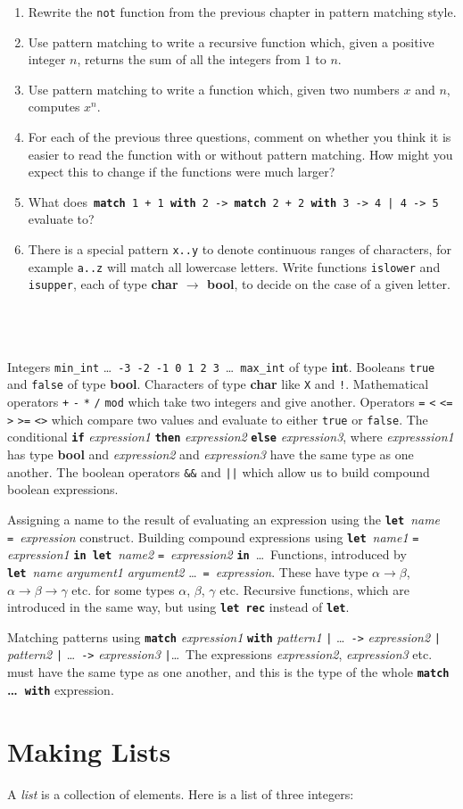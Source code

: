 \documentclass[]{book}
\newcommand\upquote[1]{\textquotesingle#1\textquotesingle}
\newcommand{\sofarstartingoff}{

\noindent 1

\noindent Integers \texttt{min\_int} \ldots\ \texttt{-3}\ \texttt{-2}\ \texttt{-1}\ \texttt{0}\ \texttt{1}\ \texttt{2}\ \texttt{3}\ \ldots\ \texttt{max\_int} of type \textbf{\textrm{int}}. Booleans \texttt{true} and \texttt{false} of type \textbf{\textrm{bool}}. \noindent Characters of type \textrm{\textbf{char}} like \texttt{\upquote{X}} and \texttt{\upquote{!}}. Mathematical operators \texttt{+} \texttt{-} \texttt{*} \texttt{/} \texttt{mod} which take two integers and give another. Operators \texttt{=} \texttt{<} \texttt{<=} \texttt{>} \texttt{>=} \texttt{<>} which compare two values and evaluate to either \texttt{true} or \texttt{false}. The conditional \textbf{\texttt{if}} \textit{expression1} \textbf{\texttt{then}} \textit{expression2} \textbf{\texttt{else}} \textit{expression3}, where \textit{expresssion1} has type \textrm{\textbf{bool}} and \textit{expression2} and \textit{expression3} have the same type as one another. The boolean operators \texttt{\&\&} and \texttt{||} which allow us to build compound boolean expressions.}
\newcommand{\sofarfunctions}
{
\noindent 2

\noindent Assigning a name to the result of evaluating an expression using the \textbf{\texttt{let}}\ \textit{name} \texttt{=}\ \textit{expression} construct. Building compound expressions using \textbf{\texttt{let}}\ \textit{name1} \texttt{=} \textit{expression1} \textbf{\texttt{in}}\ \textbf{\texttt{let}}\ \textit{name2} \texttt{=}\ \textit{expression2} \textbf{\texttt{in}}\ \ldots \ Functions, introduced by \textbf{\texttt{let}}\ \textit{name} \textit{argument1} \textit{argument2} \ldots\ \texttt{=}\ \textit{expression}. These have type $\alpha \rightarrow \beta$, $\alpha \rightarrow \beta \rightarrow \gamma$ etc. for some types $\alpha$, $\beta$, $\gamma$ etc. Recursive functions, which are introduced in the same way, but using \textbf{\texttt{let rec}} instead of \textbf{\texttt{let}}.}
\newcommand{\sofarcasebycase}
{\noindent 3

\noindent Matching patterns using \textbf{\texttt{match}} \textit{expression1} \textbf{\texttt{with}} \textit{pattern1} \texttt{|} \ldots\ \texttt{->} \textit{expression2} \texttt{|} \textit{pattern2} \texttt{|} \ldots\ \texttt{->} \textit{expression3} \texttt{|}\ldots \ The expressions \textit{expression2}, \textit{expression3} etc. must have the same type as one another, and this is the type of the whole \textbf{\texttt{match} \ldots\ \texttt{with}} expression.}
\begin{document}
\begin{enumerate}
  \item Rewrite the \texttt{not} function from the previous chapter in pattern matching style.
  \item Use pattern matching to write a recursive function which, given a positive integer $n$, returns the sum of all the integers from $1$ to $n$.
  \item Use pattern matching to write a function which, given two numbers $x$ and $n$, computes $x^n$.
  \item For each of the previous three questions, comment on whether you think it is easier to read the function with or without pattern matching. How might you expect this to change if the functions were much larger?
  \item What does\, \texttt{\textbf{match} 1 + 1 \textbf{with} 2 -> \textbf{match} 2 + 2 \textbf{with} 3 -> 4 | 4 -> 5}\, evaluate to?
  \item There is a special pattern \texttt{x..y} to denote continuous ranges of characters, for example \texttt{\upquote{a}..\upquote{z}} will match all lowercase letters. Write functions \texttt{islower} and \texttt{isupper}, each of type \textrm{\textbf{char $\rightarrow$ bool}}, to decide on the case of a given letter. 
\end{enumerate}

\cleardoublepage
\thispagestyle{empty}
\chapter*{}
\\

{\footnotesize
\sofarstartingoff

\vspace{\baselineskip}
\sofarfunctions

\vspace{\baselineskip}
\sofarcasebycase
}

\thispagestyle{empty}


\chapter{Making Lists}
\label{listingthings}
A \textit{list} is a collection of elements. Here is a list of three integers:
\end{document}
